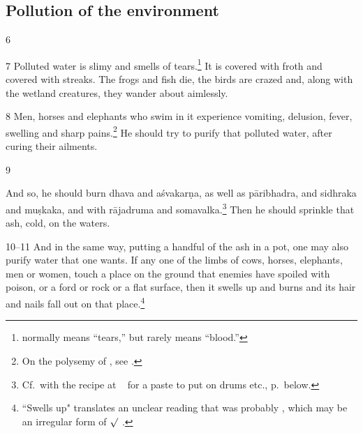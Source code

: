 \begin{translation}
\subsection{Pollution of the environment}

\item
 [6]  

\item
[7]  Polluted water is slimy and smells of  tears.\footnote{ normally 
means “tears,” but rarely means “blood.” }  It  is covered with froth and covered 
with streaks. The frogs and fish die,  the birds are crazed and, along with the 
wetland creatures, they wander about  aimlessly.  

\item [8]  Men, horses and elephants who swim in it  experience
vomiting, delusion, fever, swelling and sharp pains.\footnote{On  the
    polysemy of , see \cite{seme-1979}.} 
    He should try to purify that polluted water,  after curing their
    ailments.

\item [9]  
 
And so, he should burn \gls{dhava} and \gls{aśvakarṇa}, %
as well as \gls{pāribhadra}, %
and  \gls{sidhraka} and  \gls{muṣkaka}, %
and with \gls{rājadruma} %
and \gls{somavalka}.\footnote{\label{water-detox}Cf.\ with the
    recipe at \SS\  for a paste to put on drums etc., 
    p.\,\pageref{drum-detox} below.}
    Then he should sprinkle that ash, cold, on  the waters.

\item
 [10--11]  And in the same way, putting a handful of  the ash in a pot, one may 
 also purify water  that  one wants.  If any one of the limbs of cows, horses,  
 elephants, men or women, touch a place on the ground that enemies have 
 spoiled with  poison, or a ford or rock or a flat surface, then it swells up and 
 burns and its  hair and nails fall out on that place.\footnote{``Swells up" 
 translates an  unclear reading that was probably , which may be 
 an irregular  form of $\surd$  
 \citep[see][175--176]{whit-root}.}  


\end{translation}
